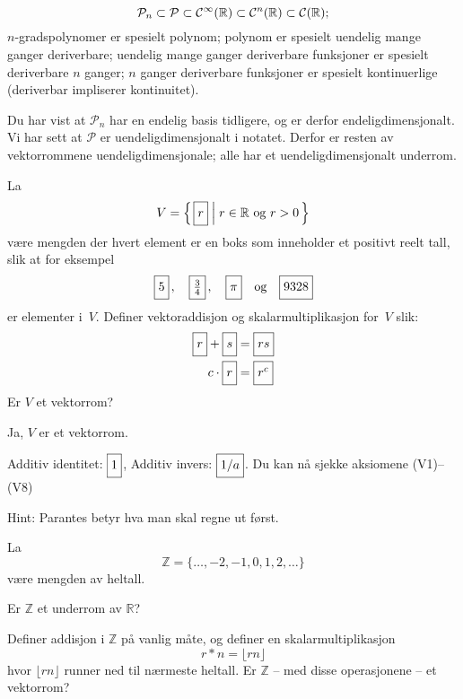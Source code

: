\begin{losning}

\begin{punkt}
$$\mathcal{P}_n \subset \mathcal{P} \subset \mathcal{C}^\infty(\mathbb{R}) \subset \mathcal{C}^n(\mathbb{R}) \subset \mathcal{C} (\mathbb{R});$$ $n$-gradspolynomer er spesielt polynom; polynom er spesielt uendelig mange ganger deriverbare; uendelig mange ganger deriverbare funksjoner er spesielt deriverbare $n$ ganger; $n$ ganger deriverbare funksjoner er spesielt kontinuerlige (deriverbar impliserer kontinuitet).
\end{punkt}

\begin{punkt}
Du har vist at $\mathcal{P}_n$ har en endelig basis tidligere, og er derfor endeligdimensjonalt. Vi har sett at $\mathcal{P}$ er uendeligdimensjonalt i notatet. Derfor er resten av vektorrommene uendeligdimensjonale; alle har et uendeligdimensjonalt underrom. 
\end{punkt}


\end{losning}



\begin{oppgave}
La
\[
V = \left\{\, \boks{r} \;\middle|\; \text{$r \in \R$ og $r > 0$} \,\right\}
\]
være mengden der hvert element er en boks som inneholder et positivt reelt tall,
slik at for eksempel
\[
\boks{5}\,,\quad
\boks{\frac{3}{4}}\,,\quad
\boks{\pi}\quad\text{og}\quad
\boks{9328}
\]
er elementer i~$V$.  Definer vektoraddisjon og skalarmultiplikasjon
for~$V$ slik:
\begin{align*}
\boks{r} + \boks{s} &= \boks{rs} \\
c \cdot \boks{r}    &= \boks{r^c}
\end{align*}
Er $V$ et vektorrom?
\end{oppgave}

\begin{losning}
Ja, $V$ er et vektorrom.

Additiv identitet: $\boks{1}$, Additiv invers: $\boks{1/a}$. Du kan nå sjekke aksiomene (V1)--(V8)

Hint: Parantes betyr hva man skal regne ut først.
\end{losning}

\begin{oppgave}
La $$\mathbb{Z}=\{\dots,-2,-1,0,1,2,\dots\}$$ være mengden av heltall.

\begin{punkt}
Er $\mathbb{Z}$ et underrom av $\mathbb{R}$?
\end{punkt}

\begin{punkt}
Definer addisjon i $\mathbb{Z}$ på vanlig måte, og definer en skalarmultiplikasjon $$r\ast n=\lfloor rn\rfloor$$ hvor $\lfloor rn \rfloor$ runner ned til nærmeste heltall. Er $\mathbb{Z}$ -- med disse operasjonene -- et vektorrom?
\end{punkt}

\end{oppgave}


